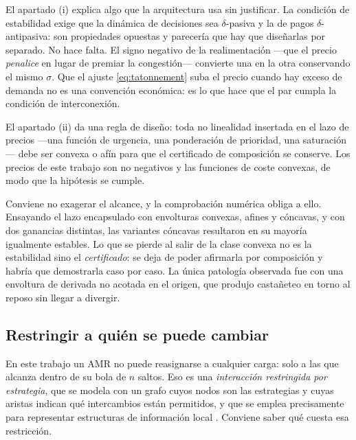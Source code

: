 \begin{observacion}
\label{obs:signo-menos}
El apartado (i) explica algo que la arquitectura usa sin justificar. La condición
de estabilidad exige que la dinámica de decisiones sea $\delta$-pasiva y la de
pagos $\delta$-antipasiva: son propiedades opuestas y parecería que hay que
diseñarlas por separado. No hace falta. El signo negativo de la realimentación
—que el precio \emph{penalice} en lugar de premiar la congestión— convierte una
en la otra conservando el mismo $\sigma$. Que el ajuste \eqref{eq:tatonnement}
suba el precio cuando hay exceso de demanda no es una convención económica: es lo
que hace que el par cumpla la condición de interconexión.
\end{observacion}

\begin{observacion}
\label{obs:convexidad-encapsulado}
El apartado (ii) da una regla de diseño: toda no linealidad insertada en el lazo
de precios —una función de urgencia, una ponderación de prioridad, una
saturación— debe ser convexa o afín para que el certificado de composición se
conserve. Los precios de este trabajo son no negativos y las funciones de coste
convexas, de modo que la hipótesis se cumple.

Conviene no exagerar el alcance, y la comprobación numérica obliga a ello.
Ensayando el lazo encapsulado con envolturas convexas, afines y cóncavas, y con
dos ganancias distintas, las variantes cóncavas resultaron en su mayoría
igualmente estables. Lo que se pierde al salir de la clase convexa no es la
estabilidad sino el \emph{certificado}: se deja de poder afirmarla por
composición y habría que demostrarla caso por caso. La única patología observada
fue con una envoltura de derivada no acotada en el origen, que produjo
castañeteo en torno al reposo sin llegar a divergir.
\end{observacion}

\subsection{Restringir a quién se puede cambiar}

En este trabajo un AMR no puede reasignarse a cualquier carga: solo a las que
alcanza dentro de su bola de $n$ saltos. Eso es una \emph{interacción restringida
por estrategia}, que se modela con un grafo cuyos nodos son las estrategias y
cuyas aristas indican qué intercambios están permitidos, y que se emplea
precisamente para representar estructuras de información local
\cite{quijano2017role}. Conviene saber qué cuesta esa restricción.

